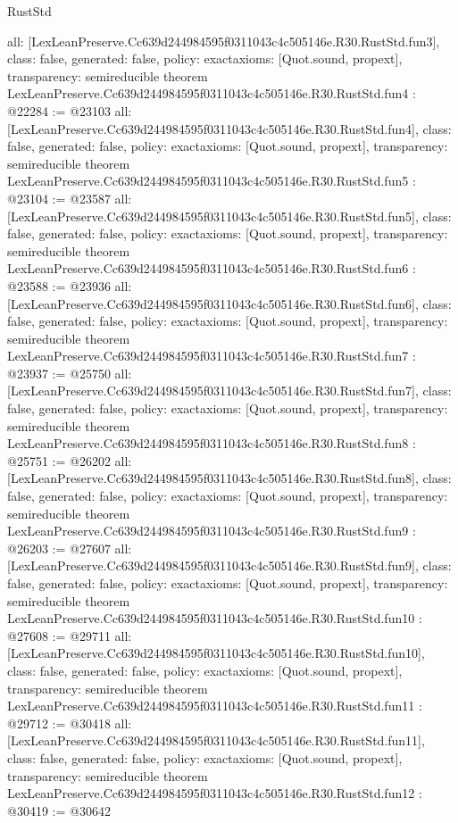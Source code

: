 \begin{lexlean}{RustStd}
\begin{coremodule}
{  all: [LexLeanPreserve.Cc639d244984595f0311043c4c505146e.R30.RustStd.fun3],
  class: false,
  generated: false,
  policy: exact{axioms: [Quot.sound, propext]},
  transparency: semireducible
}
theorem LexLeanPreserve.Cc639d244984595f0311043c4c505146e.R30.RustStd.fun4 : @22284 := @23103 {
  all: [LexLeanPreserve.Cc639d244984595f0311043c4c505146e.R30.RustStd.fun4],
  class: false,
  generated: false,
  policy: exact{axioms: [Quot.sound, propext]},
  transparency: semireducible
}
theorem LexLeanPreserve.Cc639d244984595f0311043c4c505146e.R30.RustStd.fun5 : @23104 := @23587 {
  all: [LexLeanPreserve.Cc639d244984595f0311043c4c505146e.R30.RustStd.fun5],
  class: false,
  generated: false,
  policy: exact{axioms: [Quot.sound, propext]},
  transparency: semireducible
}
theorem LexLeanPreserve.Cc639d244984595f0311043c4c505146e.R30.RustStd.fun6 : @23588 := @23936 {
  all: [LexLeanPreserve.Cc639d244984595f0311043c4c505146e.R30.RustStd.fun6],
  class: false,
  generated: false,
  policy: exact{axioms: [Quot.sound, propext]},
  transparency: semireducible
}
theorem LexLeanPreserve.Cc639d244984595f0311043c4c505146e.R30.RustStd.fun7 : @23937 := @25750 {
  all: [LexLeanPreserve.Cc639d244984595f0311043c4c505146e.R30.RustStd.fun7],
  class: false,
  generated: false,
  policy: exact{axioms: [Quot.sound, propext]},
  transparency: semireducible
}
theorem LexLeanPreserve.Cc639d244984595f0311043c4c505146e.R30.RustStd.fun8 : @25751 := @26202 {
  all: [LexLeanPreserve.Cc639d244984595f0311043c4c505146e.R30.RustStd.fun8],
  class: false,
  generated: false,
  policy: exact{axioms: [Quot.sound, propext]},
  transparency: semireducible
}
theorem LexLeanPreserve.Cc639d244984595f0311043c4c505146e.R30.RustStd.fun9 : @26203 := @27607 {
  all: [LexLeanPreserve.Cc639d244984595f0311043c4c505146e.R30.RustStd.fun9],
  class: false,
  generated: false,
  policy: exact{axioms: [Quot.sound, propext]},
  transparency: semireducible
}
theorem LexLeanPreserve.Cc639d244984595f0311043c4c505146e.R30.RustStd.fun10 : @27608 := @29711 {
  all: [LexLeanPreserve.Cc639d244984595f0311043c4c505146e.R30.RustStd.fun10],
  class: false,
  generated: false,
  policy: exact{axioms: [Quot.sound, propext]},
  transparency: semireducible
}
theorem LexLeanPreserve.Cc639d244984595f0311043c4c505146e.R30.RustStd.fun11 : @29712 := @30418 {
  all: [LexLeanPreserve.Cc639d244984595f0311043c4c505146e.R30.RustStd.fun11],
  class: false,
  generated: false,
  policy: exact{axioms: [Quot.sound, propext]},
  transparency: semireducible
}
theorem LexLeanPreserve.Cc639d244984595f0311043c4c505146e.R30.RustStd.fun12 : @30419 := @30642 {
}
\end{coremodule}
\end{lexlean}
